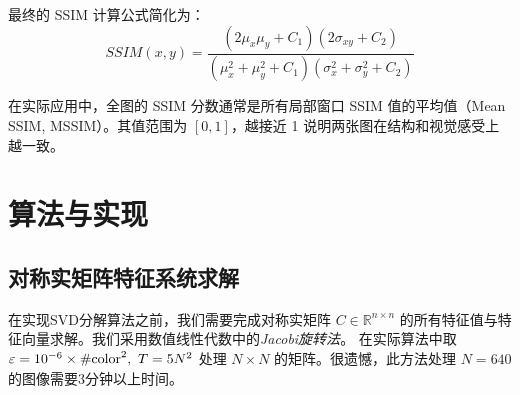 	最终的 SSIM 计算公式简化为：
	\begin{equation*}
		SSIM(x,y) = \frac{(2\mu_x\mu_y + C_1)(2\sigma_{xy} + C_2)}{(\mu_x^2 + \mu_y^2 + C_1)(\sigma_x^2 + \sigma_y^2 + C_2)}
	\end{equation*}
	
	在实际应用中，全图的 SSIM 分数通常是所有局部窗口 SSIM 值的平均值（Mean SSIM, MSSIM）。其值范围为 $[0, 1]$，越接近 1 说明两张图在结构和视觉感受上越一致。

	\section{算法与实现}
	
	\subsection{对称实矩阵特征系统求解}
	
	在实现SVD分解算法之前，我们需要完成对称实矩阵 $C \in \mathbb{R}^{n\times n}$ 的所有特征值与特征向量求解。我们采用数值线性代数中的\textit{Jacobi旋转法}。	
	在实际算法中取 $\varepsilon = 10^{-6} \times\text{\#color}^2, \  T = 5N^2$ 处理 $N \times N$ 的矩阵。很遗憾，此方法处理 $N = 640$ 的图像需要3分钟以上时间。
	
